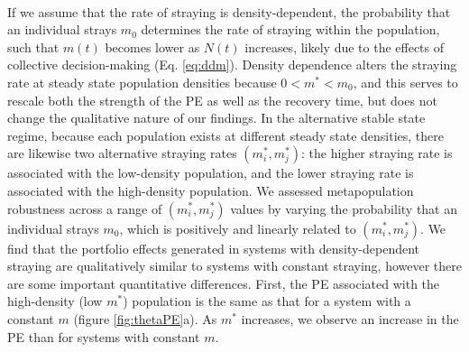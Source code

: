 \documentclass[twocolumn,preprintnumbers,amsmath,amssymb,superscriptaddress]{revtex4}
\begin{document}
 \\
If we assume that the rate of straying is density-dependent, the probability that an individual strays $m_0$ determines the rate of straying within the population, such that $m(t)$ becomes lower as $N(t)$ increases, likely due to the effects of collective decision-making \cite{Berdahl:2016dx} (Eq. \ref{eq:ddm}).
Density dependence alters the straying rate at steady state population densities because $0 < m^* < m_0$, and this serves to rescale both the strength of the PE as well as the recovery time, but does not change the qualitative nature of our findings.
In the alternative stable state regime, because each population exists at different steady state densities, there are likewise two alternative straying rates $(m_i^*,m_j^*)$: the higher straying rate is associated with the low-density population, and the lower straying rate is associated with the high-density population.
We assessed metapopulation robustness across a range of $(m_i^*,m_j^*)$ values by varying the probability that an individual strays $m_0$, which is positively and linearly related to $(m_i^*,m_j^*)$.
We find that the portfolio effects generated in systems with density-dependent straying are qualitatively similar to systems with constant straying, however there are some important quantitative differences.
First, the PE associated with the high-density (low $m^*$) population is the same as that for a system with a constant $m$ (figure \ref{fig:thetaPE}a).
As $m^*$ increases, we observe an increase in the PE than for systems with constant $m$.
\end{document}
